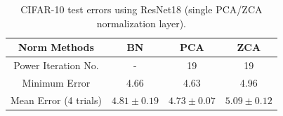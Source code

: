 \documentclass{article}
\begin{document}
\begin{table}[!htb]
\begin{centering}
\begin{tabular}{|c|c|c|c|}
\hline
Norm Methods          & BN        & PCA       & ZCA       \\ \hline
Power Iteration No.   & -         & 19        & 19        \\ \hline
Minimum Error         & 4.66      & 4.63      & 4.96      \\ \hline
Mean Error (4 trials) & $4.81 \pm 0.19$ &  $4.73	\pm 0.07$ & $5.09	 \pm 0.12$ \\ \hline
\end{tabular}
\caption{CIFAR-10 test errors using ResNet18 (single PCA/ZCA normalization layer).}
\end{centering}
\end{table}


\medskip
\small


\end{document}
